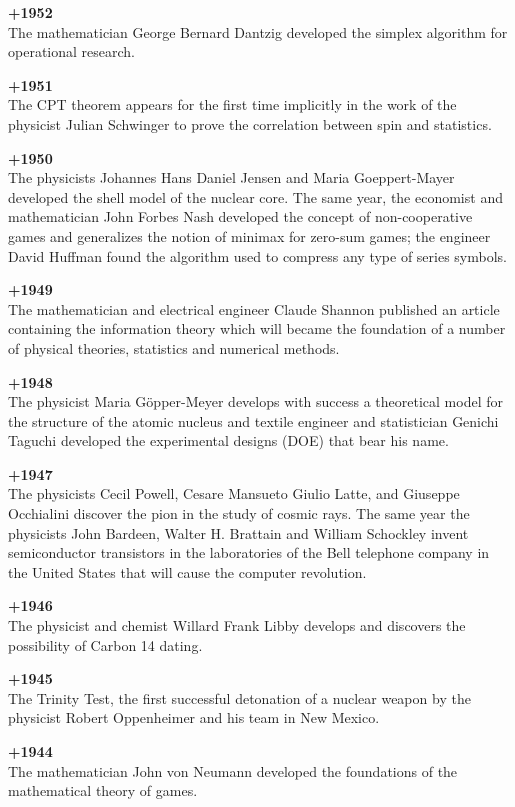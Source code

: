 \textbf{+1952}\\
The mathematician George Bernard Dantzig developed the simplex algorithm for operational research.

\textbf{+1951}\\
The CPT theorem appears for the first time implicitly in the work of the physicist Julian Schwinger to prove the correlation between spin and statistics.

\textbf{+1950}\\
The physicists Johannes Hans Daniel Jensen and Maria Goeppert-Mayer developed the shell model of the nuclear core. The same year, the economist and mathematician John Forbes Nash developed the concept of non-cooperative games and generalizes the notion of minimax for zero-sum games; the engineer David Huffman found the algorithm used to compress any type of series symbols.

\textbf{+1949}\\
The mathematician and electrical engineer Claude Shannon published an article containing the information theory which will became the foundation of a number of physical theories, statistics and numerical methods.

\textbf{+1948}\\
The physicist Maria Göpper-Meyer develops with success a theoretical model for the structure of the atomic nucleus and textile engineer and statistician Genichi Taguchi developed the experimental designs (DOE) that bear his name.

\textbf{+1947}\\
The physicists Cecil Powell, Cesare Mansueto Giulio Latte, and Giuseppe Occhialini discover the pion in the study of cosmic rays. The same year the physicists John Bardeen, Walter H. Brattain and William Schockley invent semiconductor transistors in the laboratories of the Bell telephone company in the United States that will cause the computer revolution.

\textbf{+1946}\\
The physicist and chemist Willard Frank Libby develops and discovers the possibility of Carbon 14 dating.

\textbf{+1945}\\
The Trinity Test, the first successful detonation of a nuclear weapon by the physicist Robert Oppenheimer and his team in New Mexico.

\textbf{+1944}\\
The mathematician John von Neumann developed the foundations of the mathematical theory of games.

